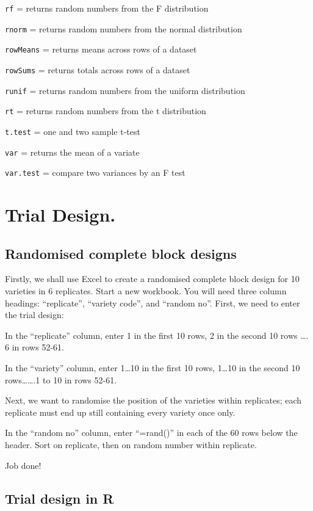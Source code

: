 \documentclass[
]{book}
\begin{document}
\texttt{rf} = returns random numbers from the F distribution

\texttt{rnorm} = returns random numbers from the normal distribution

\texttt{rowMeans} = returns means across rows of a dataset

\texttt{rowSums} = returns totals across rows of a dataset

\texttt{runif} = returns random numbers from the uniform distribution

\texttt{rt} = returns random numbers from the t distribution

\texttt{t.test} = one and two sample t-test

\texttt{var} = returns the mean of a variate

\texttt{var.test} = compare two variances by an F test

\hypertarget{Trial-design}{%
\chapter{Trial Design.}\label{Trial-design}}

\hypertarget{randomised-complete-block-designs}{%
\section{Randomised complete block designs}\label{randomised-complete-block-designs}}

Firstly, we shall use Excel to create a randomised complete block design for 10 varieties in 6 replicates. Start a new workbook. You will need three column headings: ``replicate'', ``variety code'', and ``random no''. First, we need to enter the trial design:

In the ``replicate'' column, enter 1 in the first 10 rows, 2 in the second 10 rows \ldots. 6 in rows 52-61.

In the ``variety'' column, enter 1\ldots10 in the first 10 rows, 1\ldots10 in the second 10 rows\ldots\ldots.1 to 10 in rows 52-61.

Next, we want to randomise the position of the varieties within replicates; each replicate must end up still containing every variety once only.

In the ``random no'' column, enter ``=rand()'' in each of the 60 rows below the header. Sort on replicate, then on random number within replicate.

Job done!

\hypertarget{trial-design-in-r}{%
\section{Trial design in R}\label{trial-design-in-r}}
\end{document}
